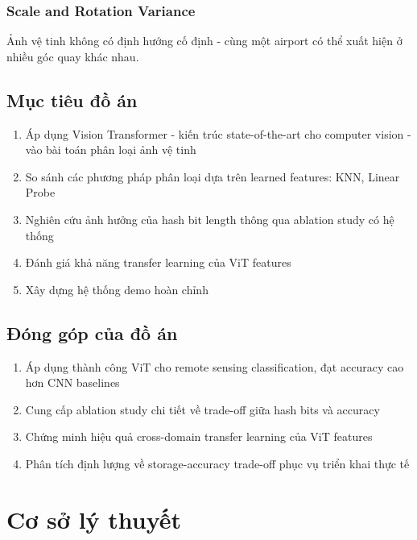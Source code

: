 \documentclass[12pt,a4paper]{article}
\begin{document}
\subsubsection{Scale and Rotation Variance}

Ảnh vệ tinh không có định hướng cố định - cùng một airport có thể xuất hiện ở nhiều góc quay khác nhau.

\subsection{Mục tiêu đồ án}

\begin{enumerate}
    \item Áp dụng Vision Transformer - kiến trúc state-of-the-art cho computer vision - vào bài toán phân loại ảnh vệ tinh
    \item So sánh các phương pháp phân loại dựa trên learned features: KNN, Linear Probe
    \item Nghiên cứu ảnh hưởng của hash bit length thông qua ablation study có hệ thống
    \item Đánh giá khả năng transfer learning của ViT features
    \item Xây dựng hệ thống demo hoàn chỉnh
\end{enumerate}

\subsection{Đóng góp của đồ án}

\begin{enumerate}
    \item Áp dụng thành công ViT cho remote sensing classification, đạt accuracy cao hơn CNN baselines
    \item Cung cấp ablation study chi tiết về trade-off giữa hash bits và accuracy
    \item Chứng minh hiệu quả cross-domain transfer learning của ViT features
    \item Phân tích định lượng về storage-accuracy trade-off phục vụ triển khai thực tế
\end{enumerate}

\section{Cơ sở lý thuyết}
\end{document}
